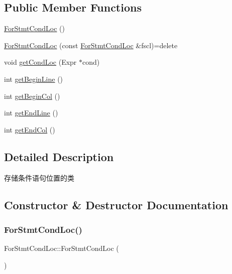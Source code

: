 \subsection*{Public Member Functions}
\begin{DoxyCompactItemize}
\item 
\hyperlink{classForStmtCondLoc_a62921ad2ca6417c087e8aa28395aee91}{For\+Stmt\+Cond\+Loc} ()
\item 
\hyperlink{classForStmtCondLoc_acb5c9643f2ce6be473e989c23c2d50e6}{For\+Stmt\+Cond\+Loc} (const \hyperlink{classForStmtCondLoc}{For\+Stmt\+Cond\+Loc} \&fscl)=delete
\item 
void \hyperlink{classForStmtCondLoc_a4579427843bc16d2ae834d234ed4a637}{get\+Cond\+Loc} (Expr $\ast$cond)
\item 
int \hyperlink{classForStmtCondLoc_adbb37a870f04545f48f62569b41f5102}{get\+Begin\+Line} ()
\item 
int \hyperlink{classForStmtCondLoc_a7db6511efc55de237119bc13f80915e0}{get\+Begin\+Col} ()
\item 
int \hyperlink{classForStmtCondLoc_aa3dc75623c0ccbc94fbd42ec784eeba1}{get\+End\+Line} ()
\item 
int \hyperlink{classForStmtCondLoc_a68dd344d53c30751ca6c0f6c4aaa49d0}{get\+End\+Col} ()
\end{DoxyCompactItemize}


\subsection{Detailed Description}
存储条件语句位置的类 

\subsection{Constructor \& Destructor Documentation}
\mbox{\label{classForStmtCondLoc_a62921ad2ca6417c087e8aa28395aee91}} 
\subsubsection{\texorpdfstring{For\+Stmt\+Cond\+Loc()}{ForStmtCondLoc()}\hspace{0.1cm}{\footnotesize\ttfamily [1/2]}}
{\footnotesize\ttfamily For\+Stmt\+Cond\+Loc\+::\+For\+Stmt\+Cond\+Loc (\begin{DoxyParamCaption}{ }\end{DoxyParamCaption})}


